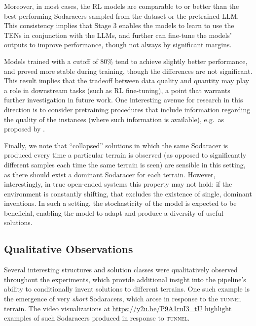 \documentclass{article}
\begin{document}
Moreover, in most cases, the RL models are comparable to or better than the best-performing Sodaracers sampled from the dataset or the pretrained LLM. This consistency implies that Stage 3 enables the models to learn to use the TENs in conjunction with the LLMs, and further can fine-tune the models' outputs to improve performance, though not always 
by significant margins. %

Models trained with a cutoff of 80\% tend to achieve slightly better performance, and proved more stable during training, though the differences are not significant. This result implies that the tradeoff between data quality and quantity may play a role in downstream tasks (such as RL fine-tuning), a point that warrants further investigation in future work. One interesting avenue for research in this direction is to consider pretraining procedures that include information regarding the quality of the instances (where such information is available), e.g.~as proposed by \citet{chen2021decision}. 

Finally, we note that ``collapsed'' solutions in which the same Sodaracer is produced every time a particular terrain is observed (as opposed to significantly different samples each time the same terrain is seen) are sensible in this setting, as there should exist a dominant Sodaracer for each terrain. 
However, interestingly, in true open-ended systems this property may not hold: if the environment is constantly shifting, that excludes the existence of single, dominant inventions. In such a setting, the stochasticity of the model is expected to be beneficial, enabling the model to adapt and produce a diversity of useful solutions.

\subsection{Qualitative Observations}
\label{sec:wheel}

Several interesting structures and solution classes were qualitatively observed throughout the experiments, which provide additional insight into the pipeline’s ability to conditionally invent solutions to different terrains. One such example is the emergence of very \emph{short} Sodaracers, which arose in response to the \textsc{tunnel} terrain. The video visualizations at \url{https://y2u.be/P9A1ruI3_tU}  highlight examples of such Sodaracers produced in response to \textsc{tunnel}.
\end{document}
